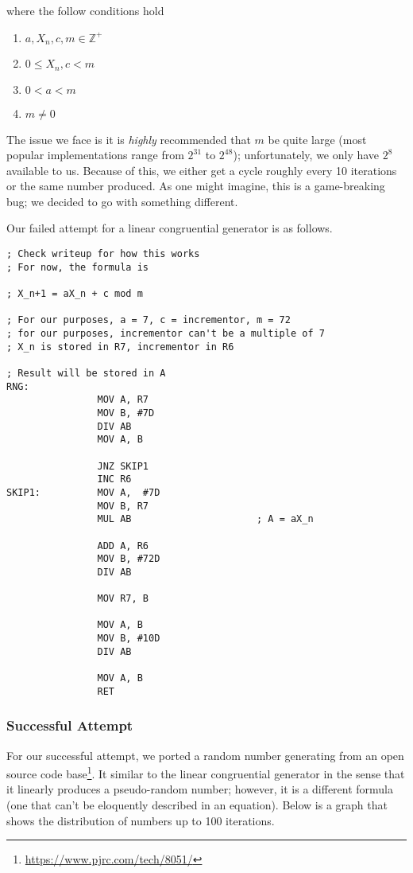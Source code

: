 \documentclass[12pt]{article}
\begin{document}
\noindent where the follow conditions hold

\begin{enumerate}
    \item $a, X_n, c, m \in \mathbb{Z}^+$
    \item $0 \leq X_n, c < m$
    \item $0 < a < m$
    \item $m \neq 0$
\end{enumerate}

The issue we face is it is \textit{highly} recommended that $m$ be quite large (most popular implementations range from $2^{31}$ to $2^{48}$); unfortunately, we only have $2^8$ available to us. Because of this, we either get a cycle roughly every \num{10} iterations or the same number produced. As one might imagine, this is a game-breaking bug; we decided to go with something different.

Our failed attempt for a linear congruential generator is as follows.

\begin{verbatim}
; Check writeup for how this works
; For now, the formula is

; X_n+1 = aX_n + c mod m

; For our purposes, a = 7, c = incrementor, m = 72
; for our purposes, incrementor can't be a multiple of 7
; X_n is stored in R7, incrementor in R6

; Result will be stored in A
RNG:
                MOV A, R7
                MOV B, #7D
                DIV AB
                MOV A, B

                JNZ SKIP1
                INC R6
SKIP1:          MOV A,  #7D
                MOV B, R7
                MUL AB                      ; A = aX_n

                ADD A, R6
                MOV B, #72D
                DIV AB

                MOV R7, B

                MOV A, B
                MOV B, #10D
                DIV AB

                MOV A, B
                RET
\end{verbatim}

\subsubsection{Successful Attempt}
For our successful attempt, we ported a random number generating from an open source code base\footnote{\url{https://www.pjrc.com/tech/8051/}}. It similar to the linear congruential generator in the sense that it linearly produces a pseudo-random number; however, it is a different formula (one that can't be eloquently described in an equation). Below is a graph that shows the distribution of numbers up to \num{100} iterations.
\end{document}
